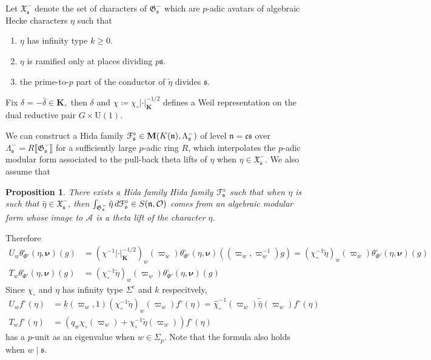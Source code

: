 \documentclass[leqno]{amsart}
\newcommand{\euF}{\EuScript{F}} %
\newcommand{\M}{\mathbf{M}} %
\newcommand{\bnu}{\boldsymbol{\nu}}
\newcommand{\wt}[1]{\underline{ #1 }}
\newcommand{\fG}{\mathfrak{G}}
\newcommand{\fX}{\mathfrak{X}}
\newcommand{\K}{{\mathbf{K}}} %
\newcommand{\oo}{\mathcal{O}} %
\newcommand{\fc}{\mathfrak{c}}
\newcommand{\fs}{\mathfrak{s}}
\newcommand{\fn}{\mathfrak{n}}
\newtheorem{prop}[thm]{Proposition}
\theoremstyle{definition}
\theoremstyle{remark}
\begin{document}
Let $\fX_{\fs}^-$ denote
the set of characters of $\fG_{\fs}^-$
which are $p$-adic avatars of 
algebraic Hecke characters $\eta$ such that 
\begin{enumerate}
    \item $\eta$ has infinity type $k\geq 0$.
    \item $\eta$ is ramified only at places dividing $p\fs$.
    \item the prime-to-$p$ part of the conductor of $\tilde{\eta}$ divides $\fs$.
\end{enumerate}
Fix $\delta=-\bar{\delta}\in \K$,\
then $\delta$ and $\chi\coloneqq \chi_\circ|\cdot|_\K^{-1/2}$
defines a Weil representation
on the dual reductive pair $G\times \mathrm{U}(1)$.



We can construct a Hida family $\euF^\circ_{\fs}\in \M(K(\fn),\Lambda_{\fs}^-)$
of level $\fn=\fc\fs$ over $\Lambda_{\fs}^-=R\llbracket \fG_{\fs}^-\rrbracket$ for 
a sufficiently large $p$-adic ring $R$,
which interpolates the $p$-adic modular form
associated to the pull-back theta lifts of $\eta$ when $\eta\in \fX_{\fs}^-$.
We also assume that


\begin{prop}\cite[Thm 7.6]{lee}
There exists a Hida family
Hida family $\euF^\circ_{\fs}$ such that 
when $\eta$ is such that  $ \hat{\eta}\in \fX_\fs^{-}$,
then 
$\int_{\fG_{\fs}^{-}}\hat{\eta}\,d\euF^\circ_{\fs}
\in S(\fn, \oo)$
comes from an algebraic modular form
whose image to $\mathcal{A}$
is a theta lift of the character  $\eta$.
\end{prop}

Therefore
\begin{align*}
    U_w\theta^\square_{\Phi'}(\eta,\bnu)(g)&=
    (\chi^{-1}|\cdot|_\K^{-1/2})_w(\varpi_w)
    \theta^\square_{\Phi'}(\eta,\bnu)((\varpi_w,\varpi_w^{-1})g)
    =(\chi_\circ^{-1}\tilde{\eta})_w(\varpi_w)
    \theta^\square_{\Phi'}(\eta,\bnu)(g)\\
    T_w\theta^\square_{\Phi'}(\eta,\bnu)(g)&=
    (\chi_\circ^{-1}\tilde{\eta})_w(\varpi_w)
    \theta^\square_{\Phi'}(\eta,\bnu)(g)
\end{align*}
Since $\chi_\circ$ and $\eta$ has infinity type $\Sigma^c$ and $k$ respecitvely,
\begin{align}
    U_wf^\circ(\eta)&=
    \wt{k}(\varpi_w,1)
    (\chi_\circ^{-1}\tilde{\eta})_w(\varpi_w)f^\circ(\eta)=
    \hat{\chi}_\circ^{-1}(\varpi_w)\tilde{\hat{\eta}}(\varpi_w)f^\circ(\eta)\\
    T_wf^\circ(\eta)&=
    (q_w\chi_\circ(\varpi_w)
    +\chi_\circ^{-1}\tilde{\eta}(\varpi_w))
    f^\circ(\eta)
\end{align}
has a $p$-unit as an eigenvalue when $w\in \Sigma_p$.
Note that the formula also holds when $w\mid \fs$.
\end{document}

